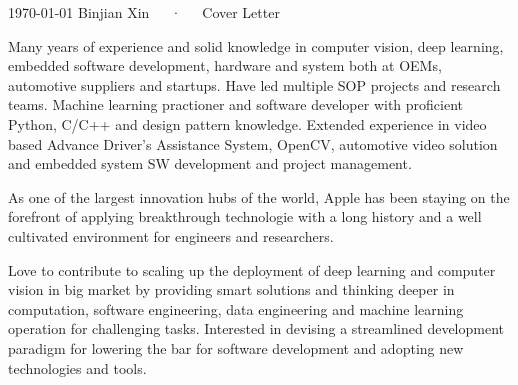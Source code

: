 \documentclass[11pt, a4paper]{awesome-cv}
\begin{document}
\makecvheader[R]

\makecvfooter
  {\today}
  {Binjian Xin~~~·~~~Cover Letter}
  {}

\makelettertitle

\begin{cvletter}

Many years of experience and solid knowledge in computer vision, deep learning, embedded software development, hardware and system both at OEMs, automotive suppliers and startups. Have led multiple SOP projects and research teams. Machine learning practioner and software developer with proficient Python, C/C++ and design pattern knowledge. Extended experience in video based Advance Driver’s Assistance System, OpenCV, automotive video solution and embedded system SW development and project management.

As one of the largest innovation hubs of the world, Apple has been staying on the forefront of applying breakthrough technologie with a long history and a well cultivated environment for engineers and researchers.

Love to contribute to scaling up the deployment of deep learning and computer vision in big market by providing smart solutions and thinking deeper in computation, software engineering, data engineering and machine learning operation for challenging tasks. Interested in devising a streamlined development paradigm for lowering the bar for software development and adopting new technologies and tools.

\end{cvletter}


\makeletterclosing
\end{document}
